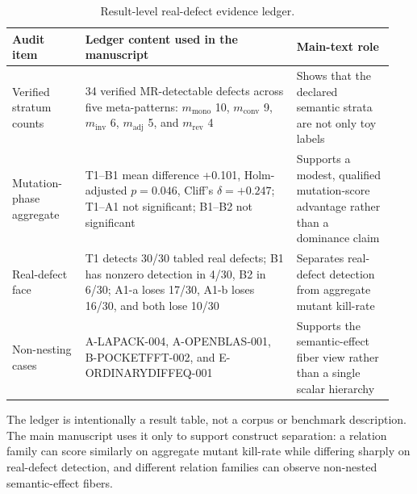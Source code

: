 \documentclass[acmsmall,screen,review]{acmart}
\begin{document}
{\def\LTcaptype{table} %
\small
\begin{longtable}[]{@{}p{0.18\linewidth}p{0.52\linewidth}p{0.24\linewidth}@{}}
\caption{Result-level real-defect evidence ledger.}\label{tab:realdefect-ledger}\\
\toprule\noalign{}
Audit item & Ledger content used in the manuscript & Main-text role \\
\midrule\noalign{}
\endfirsthead
\endhead
\bottomrule\noalign{}
\endlastfoot
Verified stratum counts & 34 verified MR-detectable defects across five
meta-patterns: \(m_{\mathrm{mono}}\) 10, \(m_{\mathrm{conv}}\) 9,
\(m_{\mathrm{inv}}\) 6, \(m_{\mathrm{adj}}\) 5, and
\(m_{\mathrm{rev}}\) 4 & Shows that the declared semantic strata are not
only toy labels \\
Mutation-phase aggregate & T1--B1 mean difference +0.101,
Holm-adjusted \(p = 0.046\), Cliff's \(\delta = +0.247\); T1--A1 not
significant; B1--B2 not significant & Supports a modest, qualified
mutation-score advantage rather than a dominance claim \\
Real-defect face & T1 detects 30/30 tabled real defects; B1 has nonzero
detection in 4/30, B2 in 6/30; A1-a loses 17/30, A1-b loses 16/30, and
both lose 10/30 & Separates real-defect detection from aggregate mutant
kill-rate \\
Non-nesting cases & A-LAPACK-004, A-OPENBLAS-001, B-POCKETFFT-002, and
E-ORDINARYDIFFEQ-001 & Supports the semantic-effect fiber view rather
than a single scalar hierarchy \\
\end{longtable}
\normalsize
}

The ledger is intentionally a result table, not a corpus or benchmark
description. The main manuscript uses it only to support construct
separation: a relation family can score similarly on aggregate mutant
kill-rate while differing sharply on real-defect detection, and different
relation families can observe non-nested semantic-effect fibers.



\end{document}
